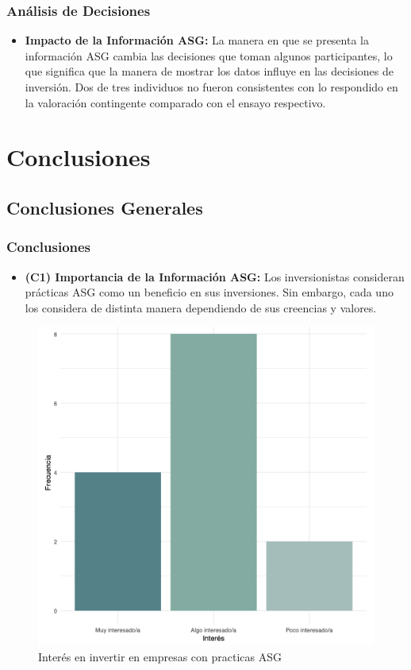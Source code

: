 \documentclass{beamer}
\begin{document}
\begin{frame}
    \frametitle{Análisis de Decisiones}
    \begin{itemize}
        
        \item \textbf{Impacto de la Información ASG:} La manera en que se presenta la información ASG cambia las decisiones que toman algunos participantes, lo que significa que la manera de mostrar los datos influye en las decisiones de inversión. Dos de tres individuos no fueron consistentes con lo respondido en la valoración contingente comparado con el ensayo respectivo.
    \end{itemize}
\end{frame}





\section{Conclusiones}

\subsection{Conclusiones Generales}
\begin{frame}
    \frametitle{Conclusiones}
    \begin{itemize}
        \item \textbf{(C1) Importancia de la Información ASG:} Los inversionistas consideran prácticas ASG como un beneficio en sus inversiones. Sin embargo, cada uno los considera de distinta manera dependiendo de sus creencias y valores.
        
    \end{itemize}
    \begin{figure}
        \centering
        \includegraphics[width=0.4\linewidth]{Latex/defensa/interes_inv_asg.png}
        \caption{Interés en invertir en empresas con practicas ASG}
    \end{figure}
\end{frame}
\end{document}
